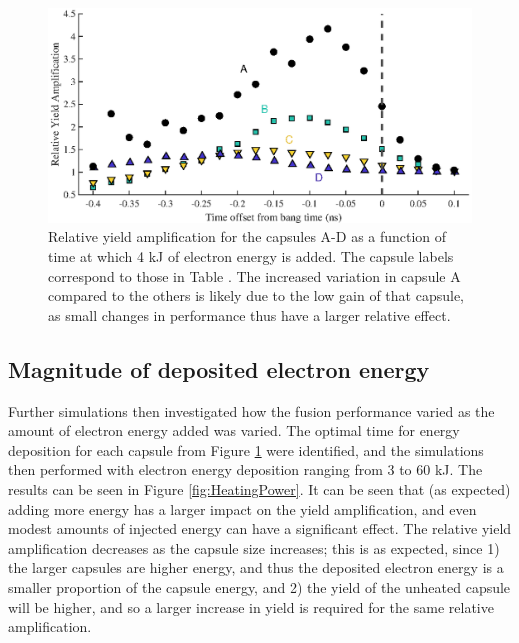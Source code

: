 \begin{figure}[ht]
\centering
\includegraphics{figures/FurtherSims/HeatingTiming.eps}
\caption{Relative yield amplification for the capsules A-D as a function of time at which 4 kJ of electron energy is added. The capsule labels correspond to those in Table \label{tab:Heating capsules}. The increased variation in capsule A compared to the others is likely due to the low gain of that capsule, as small changes in performance thus have a larger relative effect.}
\label{fig:HeatingTiming}
\end{figure}

\subsection{Magnitude of deposited electron energy}

Further simulations then investigated how the fusion performance varied as the amount of electron energy added was varied. The optimal time for energy deposition for each capsule from Figure \ref{fig:HeatingTiming} were identified, and the simulations then performed with electron energy deposition ranging from 3 to 60 kJ. The results can be seen in Figure \ref{fig:HeatingPower}. It can be seen that (as expected) adding more energy has a larger impact on the yield amplification, and even modest amounts of injected energy can have a significant effect. The relative yield amplification decreases as the capsule size increases; this is as expected, since 1) the larger capsules are higher energy, and thus the deposited electron energy is a smaller proportion of the capsule energy, and 2) the yield of the unheated capsule will be higher, and so a larger increase in yield is required for the same relative amplification.

